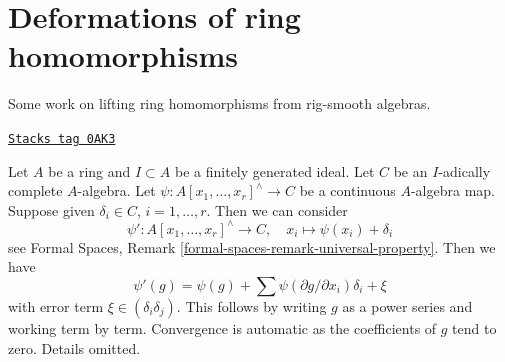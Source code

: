 \section{Deformations of ring homomorphisms}
\label{restricted-section-defos-ring-maps}
Some work on lifting ring homomorphisms from rig-smooth algebras.

\begin{remark}

\label{restricted-remark-linear-approximation}
\href{https://stacks.math.columbia.edu/tag/0AK3}{\texttt{Stacks tag 0AK3}}

Let $A$ be a ring and $I \subset A$ be a finitely generated ideal.
Let $C$ be an $I$-adically complete $A$-algebra.
Let $\psi : A[x_1, \ldots, x_r]^\wedge \to C$ be a continuous
$A$-algebra map. Suppose given $\delta_i \in C$, $i = 1, \ldots, r$.
Then we can consider
$$
\psi' : A[x_1, \ldots, x_r]^\wedge \to C,\quad
x_i \longmapsto \psi(x_i) + \delta_i
$$
see Formal Spaces, Remark \ref{formal-spaces-remark-universal-property}.
Then we have
$$
\psi'(g) = \psi(g) + \sum \psi(\partial g/\partial x_i)\delta_i + \xi
$$
with error term $\xi \in (\delta_i\delta_j)$. This follows by
writing $g$ as a power series and working term by term. Convergence
is automatic as the coefficients of $g$ tend to zero.
Details omitted.
\end{remark}

